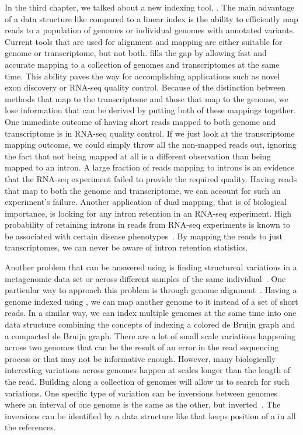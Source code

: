 In the third chapter, we talked about a new indexing tool, \pufferfish. The main advantage of a data structure like \pufferfish compared to a linear index is the ability to efficiently map reads to a population of genomes or individual genomes with annotated variants. Current tools that are used for alignment and mapping are either suitable for genome or transcriptome, but not both. \pufferfish fills the gap by allowing fast and accurate mapping to a collection of genomes and transcriptomes at the same time. This ability paves the way for accomplishing applications such as novel exon discovery or RNA-seq quality control. 
Because of the distinction between methods that map to the transcriptome and those that map to the genome, we lose information that can be derived by putting both of these mappings together. One immediate outcome of having short reads mapped to both genome and transcriptome is in RNA-seq quality control. If we just look at the transcriptome mapping outcome, we could simply throw all the non-mapped reads out, ignoring the fact that not being mapped at all is a different observation than being mapped to an intron. A large fraction of reads mapping to introns is an evidence that the RNA-seq experiment failed to provide the required quality. Having reads that map to both the genome and transcriptome, we can account for such an experiment's failure. Another application of dual mapping, that is of biological importance, is looking for any intron retention in an RNA-seq experiment. High probability of retaining introns in reads from RNA-seq experiments is known to be associated with certain disease phenotypes~\cite{faustino2003pre,tazi2009alternative}. By mapping the reads to just transcriptomes, we can never be aware of intron retention statistics.

Another problem that can be answered using \pufferfish is finding structureal variations in a metagenomic data set or across different samples of the same individual~\cite{korbel2007paired,tuzun2005fine}.
One particular way to approach this problem is through genome alignment~\cite{korbel2007paired}.
Having a genome indexed using \pufferfish,
we can map another genome to it instead of a set of short reads.
In a similar way, we can index multiple genomes at the same time into one data structure
combining the concepts of indexing a colored de Bruijn graph and a compacted de Bruijn graph.
There are a lot of small scale variations happening across two genomes
that can be the result of an error in the read sequencing process or that may not be informative enough.
However, many biologically interesting variations across genomes happen at scales longer
than the length of the read.
Building \pufferfish along a collection of genomes will allow us to search for such variations.
One specific type of variation can be inversions between genomes where an interval of one genome is the same as the other, but inverted~\cite{feuk2010inversion,turner2006assaying}.
The inversions can be identified by a data structure like \pufferfish that keeps position of a \kmer in all the references.
